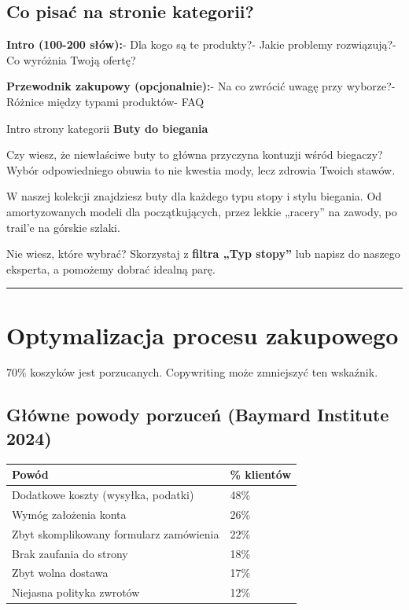 \documentclass[
  12pt,
  a4paper,
  twoside,
  openright,
  12pt,
  DIV=12,
  BCOR=12mm]{scrbook}
\newcommand{\decoline}{%
  \begin{center}
    \textcolor{bordergray}{\rule{0.3\textwidth}{0.5pt}}
  \end{center}
}
\begin{document}
\subsection{Co pisać na stronie
kategorii?}\label{co-pisaux107-na-stronie-kategorii}

\textbf{Intro (100-200 słów):}\newline - Dla kogo są te
produkty?\newline - Jakie problemy rozwiązują?\newline - Co wyróżnia
Twoją ofertę?

\textbf{Przewodnik zakupowy (opcjonalnie):}\newline - Na co zwrócić
uwagę przy wyborze?\newline - Różnice między typami produktów\newline -
FAQ

\begin{przyklad}{Intro strony kategorii}
\textbf{Buty do biegania}

Czy wiesz, że niewłaściwe buty to główna przyczyna kontuzji wśród biegaczy? Wybór odpowiedniego obuwia to nie kwestia mody, lecz zdrowia Twoich stawów.

W naszej kolekcji znajdziesz buty dla każdego typu stopy i stylu biegania. Od amortyzowanych modeli dla początkujących, przez lekkie „racery” na zawody, po trail'e na górskie szlaki.

Nie wiesz, które wybrać? Skorzystaj z \textbf{filtra „Typ stopy”} lub napisz do naszego eksperta, a pomożemy dobrać idealną parę.
\end{przyklad}

\decoline

\section{Optymalizacja procesu
zakupowego}\label{optymalizacja-procesu-zakupowego}

70\% koszyków jest porzucanych. Copywriting może zmniejszyć ten
wskaźnik.

\subsection{Główne powody porzuceń (Baymard Institute
2024)}\label{gux142uxf3wne-powody-porzuceux144-baymard-institute-2024}

\begin{longtable}[]{@{}ll@{}}
\toprule\noalign{}
Powód & \% klientów \\
\midrule\noalign{}
\endhead
\bottomrule\noalign{}
\endlastfoot
Dodatkowe koszty (wysyłka, podatki) & 48\% \\
Wymóg założenia konta & 26\% \\
Zbyt skomplikowany formularz zamówienia & 22\% \\
Brak zaufania do strony & 18\% \\
Zbyt wolna dostawa & 17\% \\
Niejasna polityka zwrotów & 12\% \\
\end{longtable}
\end{document}
